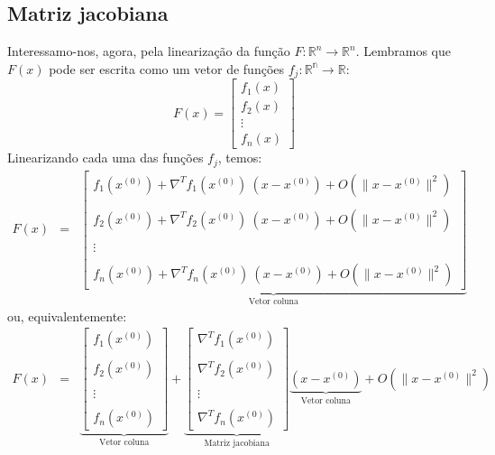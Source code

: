 \subsection{Matriz jacobiana}
Interessamo-nos, agora, pela linearização da função $F:\mathbb{R}^n\to \mathbb{R}^n$. Lembramos que $F(x)$ pode ser escrita como um vetor de funções $f_j:\mathbb{R^n}\to\mathbb{R}$:
\begin{equation}
  F(x)=\left[\begin{matrix}
      f_1(x)\\
      f_2(x)\\
      \vdots\\
      f_n(x)
    \end{matrix}\right]
\end{equation}
Linearizando cada uma das funções $f_j$, temos:
\begin{eqnarray}
F(x)&=&\underbrace{\left[
\begin{array}{c}
f_1\left(x^{(0)}\right)+\nabla^T\! f_1(x^{(0)})\!~\left(x-x^{(0)}\right)   + O(\|x-x^{(0)}\|^2)\\~\\
f_2\left(x^{(0)}\right)+\nabla^T\! f_2(x^{(0)})\!~\left(x-x^{(0)}\right)   + O(\|x-x^{(0)}\|^2)\\~\\
\vdots\\~\\
f_n\left(x^{(0)}\right)+\nabla^T\! f_n(x^{(0)})\!~\left(x-x^{(0)}\right)   + O(\|x-x^{(0)}\|^2)
\end{array}
\right]}_{\text{Vetor coluna}}
\end{eqnarray}
ou, equivalentemente:
\begin{eqnarray}
 F(x) &=&\underbrace{\left[
\begin{array}{c}
f_1\left(x^{(0)}\right)\\~\\
f_2\left(x^{(0)}\right)\\~\\
\vdots\\~\\
f_n\left(x^{(0)}\right)
\end{array}
\right]}_{\text{Vetor coluna}}+
\underbrace{\left[
\begin{array}{c}\nabla^T\! f_1(x^{(0)})\\~~\\
\nabla^T\! f_2(x^{(0)})\\~~\\
\vdots\\~~\\
\nabla^T\! f_n(x^{(0)})
\end{array}
\right]}_{\text{Matriz jacobiana}}\underbrace{\left(x-x^{(0)}\right)}_{\text{Vetor coluna}}+O(\|x-x^{(0)}\|^2)
\end{eqnarray}

